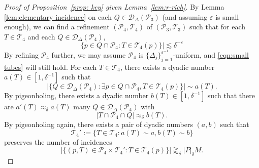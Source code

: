 \documentclass{amsart}
\newcommand{\T}{\mathcal{T}}
\newcommand{\eps}{\varepsilon}
\newcommand{\cD}{\mathcal{D}}
\newcommand{\cT}{\mathcal{T}}
\newcommand{\cP}{\mathcal{P}}
\begin{document}
\begin{proof}[Proof of Proposition~\ref{prop: key} given Lemma~\ref{lem:r-rich}]
    
    By Lemma \ref{lem:elementary incidence} on each $Q \in \cD_\Delta (\cP_{3})$ (and assuming $\eps$ is small enough), we can find a refinement $(\cP_4, \cT_4)$ of $(\cP_3, \cT_3)$ such that  for each $T\in \cT_4$ and each $Q\in \cD_{\Delta}(\cP_4)$, 
    \begin{equation}\label{eqn:small tubes}
        \{ p\in Q\cap \cP_4: T\in \cT_4(p)\}|\lesssim \delta^{-\eps}
    \end{equation}
By refining $\cP_4$ further, we may assume $\cP_4$ is $\{ \Delta_j \}_{j=1}^{\eps^{-1}}$-uniform, and \eqref{eqn:small tubes} will still hold.
For each $T\in \cT_4$, there exists  a dyadic number $a(T) \in [1, \delta^{-1}]$ such that  
\begin{equation}\label{eqn: a}
|\{Q\in \cD_{\Delta}(\cP_4): \exists p\in Q\cap \cP_4, T\in \cT_4(p)\}|\sim a(T).
\end{equation}
By pigeonholing, there exists a dyadic number $b(T) \in [1, \delta^{-1}]$ such that there are $a'(T) \approx_{\delta} a(T)$ many $Q\in \cD_{\Delta}(\cP_4)$ with 
\[ |T\cap \cP_4\cap Q|\approx_{\delta} b(T). \]
By pigeonholing again, there exists a pair of dyadic numbers $(a,b)$ such that \[ \cT_4':=\{ T\in \cT_4: a(T)\sim a, b(T)\sim b\}\] preserves the number of incidences
\begin{equation}\label{eqn:preserve incidences}
            |\{ (p, T) \in \cP_4 \times \cT_4' : T \in \T_4 (p) \}| \gtrapprox_{\delta} |P|_\delta M.
        \end{equation}

    



\end{proof}
\end{document}
